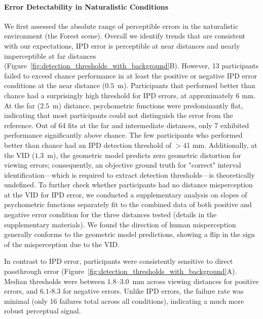 \paragraph{Error Detectability in Naturalistic Conditions}
We first assessed the absolute range of perceptible errors in the naturalistic environment (the Forest scene).  Overall we identify trends that are consistent with our expectations, IPD error is perceptible at near distances and nearly imperceptible at far distances (Figure~\ref{fig:detection_thresholds_with_background}B).  However, 13 participants failed to exceed chance performance in at least the positive or negative IPD error conditions at the near distance ($0.5$~m). Participants that performed better than chance had a surprisingly high threshold for IPD errors, at approximately 6 mm. At the far ($2.5$~m) distance, psychometric functions were predominantly flat, indicating that most participants could not distinguish the error from the reference. Out of 64 fits at the far and intermediate distances, only 7 exhibited performance significantly above chance. The few participants who performed better than chance had an IPD detection threshold of $>$41 mm. Additionally, at the VID ($1.3$~m), the geometric model predicts zero geometric distortion for viewing errors; consequently, an objective ground truth for "correct" interval identification—which is required to extract detection thresholds—is theoretically undefined. To further check whether participants had no distance misperception at the VID for IPD error, we conducted a supplementary analysis on slopes of psychometric functions separately fit to the combined data of both positive and negative error condition for the three distances tested (details in the supplementary materials). We found the direction of human misperception generally conforms to the geometric model predictions, showing a flip in the sign of the misperception due to the VID. 


In contrast to IPD error, participants were consistently sensitive to direct passthrough error (Figure~\ref{fig:detection_thresholds_with_background}A). Median thresholds were between $1.8$--$3.0$~mm across viewing distances for positive errors, and $6.1$-$8.3$ for negative errors. Unlike IPD errors, the failure rate was minimal (only 16 failures total across all conditions), indicating a much more robust perceptual signal.

